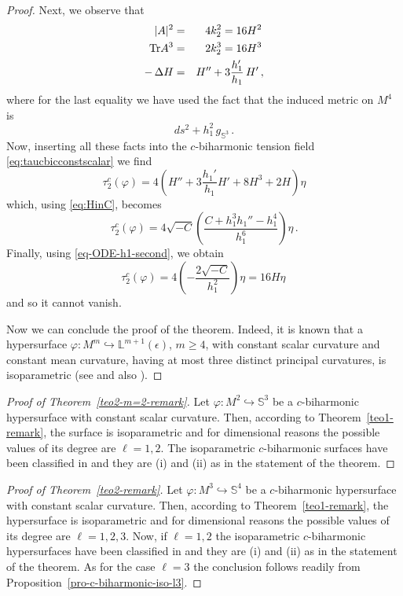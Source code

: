 \documentclass[11pt,leqno]{amsart}
\theoremstyle{plain}
\theoremstyle{definition}
\numberwithin{equation}{section}
\def \s{{\mathbb S}}
\numberwithin{equation}{section}
\begin{document}
{\begin{proof}
Next, we observe that
\begin{eqnarray}\label{eq-dati-non-c-biharmonic}
|A|^2&=&4 k_2^2 =16 H^2\,\\\nonumber
{\rm Tr}A^3&=&2 k_2^3 =16 H^3\,\\\nonumber
-\,\Delta H&=&H''+3 \frac{h_1'}{h_1}\,H' \,,
\end{eqnarray}
where for the last equality we have used the fact that the induced metric on $M^4$ is
\[
ds^2+h_1^2 \, g_{\s^3} \,.
\]
Now, inserting all these facts into the $c$-biharmonic tension field \eqref{eq:taucbicconstscalar} we find 
\[
\tau_2^c(\varphi)=4\left(H''+3 \frac{h_1'}{h_1} H'+8 H^3+2 H\right)\eta
\]
which, using \eqref{eq:HinC}, becomes 
\[
\tau_2^c(\varphi)=4\sqrt{-C} \left(\frac{C+h_1^3
   h_1''-h_1^4}{h_1^6}\right)\eta\,.
\]
Finally, using \eqref{eq-ODE-h1-second}, we obtain
\[
\tau_2^c(\varphi)=4\left( -\frac{2 \sqrt{-C}}{h_1^2}\right)\eta=16 H \eta\,
\]
and so it cannot vanish.
\vspace{3mm}

Now we can conclude the proof of the theorem. Indeed, 
it is known that a hypersurface $\varphi: M^m \hookrightarrow {\mathbb L}^{m+1}(\epsilon)$, $m\geq 4$, with constant scalar curvature and constant mean curvature, having at most three distinct principal curvatures, is isoparametric (see \cite{MR4088868} and also \cite{MR4812338}).
\end{proof}  
 
 \begin{proof}[Proof of Theorem~\ref{teo2-m=2-remark}] Let $\varphi:M^{2}\hookrightarrow\s^3$ be a $c$-biharmonic hypersurface with constant scalar curvature. Then, according to Theorem~\ref{teo1-remark}, the surface is isoparametric and for dimensional reasons the possible values of its degree are $\ell=1,2$. The isoparametric $c$-biharmonic surfaces have been classified in \cite{arXiv:2311.04493} and they are (i) and (ii) as in the statement of the theorem.
\end{proof}
 
 \begin{proof}[Proof of Theorem~\ref{teo2-remark}] Let $\varphi:M^{3}\hookrightarrow\s^4$ be a $c$-biharmonic hypersurface with constant scalar curvature. Then, according to Theorem~\ref{teo1-remark}, the hypersurface is isoparametric and for dimensional reasons the possible values of its degree are $\ell=1,2,3$. Now, if $\ell=1,2$ the isoparametric $c$-biharmonic hypersurfaces have been classified in \cite{arXiv:2311.04493} and they are (i) and (ii) as in the statement of the theorem. As for the case $\ell=3$ the conclusion follows readily from Proposition~\ref{pro-c-biharmonic-iso-l3}.
\end{proof}

}
\end{document}
